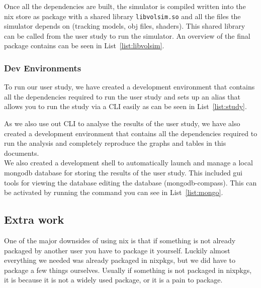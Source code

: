 Once all the dependencies are built, the simulator is compiled written into the nix store as package with a shared library \texttt{libvolsim.so} and all the files the simulator depends on (tracking models, obj files, shaders). This shared library can be called from the user study to run the simulator. An overview of the final package contains can be seen in List~\ref{list:libvolsim}.


\subsubsection{Dev Environments}

To run our user study, we have created a development environment that contains all the dependencies required to run the user study and sets up an alias that allows you to run the study via a CLI easily as can be seen in List~\ref{list:study}. 


As we also use out CLI to analyse the results of the user study, we have also created a development environment that contains all the dependencies required to run the analysis and completely reproduce the graphs and tables in this documents. \\

We also created a development shell to automatically launch and manage a local mongodb database for storing the results of the user study. This included gui tools for viewing the database editing the database (mongodb-compass). This can be activated by running the command you can see in List~\ref{list:mongo}.


\subsection{Extra work}

One of the major downsides of using nix is that if something is not already packaged by another user you have to package it yourself. Luckily almost everything we needed was already packaged in nixpkgs, but we did have to package a few things ourselves. Usually if something is not packaged in nixpkgs, it is because it is not a widely used package, or it is a pain to package. 

